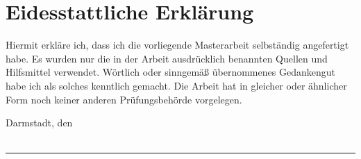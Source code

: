 \chapter*{Eidesstattliche Erklärung}

Hiermit erkläre ich, dass ich die vorliegende Masterarbeit selbständig angefertigt habe.
Es wurden nur die in der Arbeit ausdrücklich benannten Quellen und Hilfsmittel verwendet.
Wörtlich oder sinngemäß übernommenes Gedankengut habe ich als solches kenntlich gemacht.
Die Arbeit hat in gleicher oder ähnlicher Form noch keiner anderen Prüfungsbehörde vorgelegen.

\vspace{2cm}
\hfill \parbox{6cm}{Darmstadt, den \yourSubmissionDate \\ \\ \phantom{.}}  
\parbox{6cm}{\centering\hrule\medskip \yourName}